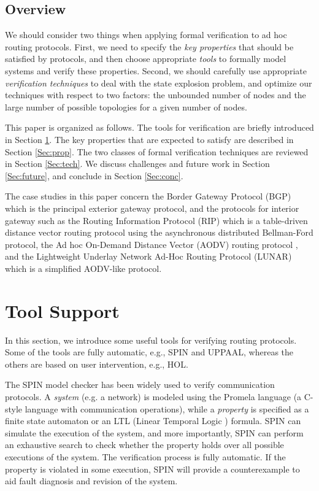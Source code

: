\documentclass[a4paper,10pt,twocolumn]{article}
\begin{document}
\subsection{Overview}
We should consider two things when applying formal verification to ad hoc routing protocols. First, we need to specify the \emph{key properties} that should be satisfied by protocols, and then choose appropriate \emph{tools} to formally model systems and verify these properties. Second, we should carefully use appropriate \emph{verification techniques} to deal with the state explosion problem, and optimize our techniques with respect to two factors: the unbounded number of nodes and the large number of possible topologies for a given number of nodes.

This paper is organized as follows. The tools for verification are briefly introduced in Section \ref{Sec:tool}. The key properties that are expected to satisfy are described in Section \ref{Sec:prop}. The two classes of formal verification techniques are reviewed in Section \ref{Sec:tech}. We discuss challenges and future work in Section \ref{Sec:future}, and conclude in Section \ref{Sec:conc}.

The case studies in this paper concern the Border Gateway Protocol (BGP) \cite{RL95,RL06} which is the principal exterior gateway protocol, and the protocols for interior gateway such as the Routing Information Protocol (RIP) \cite{Hed88,Mal93,Mal94} which is a table-driven distance vector routing protocol using the asynchronous distributed Bellman-Ford protocol, the Ad hoc On-Demand Distance Vector (AODV) routing protocol \cite{PB99,PBD03}, and the Lightweight Underlay Network Ad-Hoc Routing Protocol (LUNAR) \cite{TGRW04} which is a simplified AODV-like protocol.

\section{Tool Support}
\label{Sec:tool}
In this section, we introduce some useful tools for verifying routing protocols. Some of the tools are fully automatic, e.g., SPIN and UPPAAL, whereas the others are based on user intervention, e.g., HOL.

The SPIN model checker \cite{Hol97,Hol03} has been widely used to verify communication protocols. A \emph{system} (e.g. a network) is modeled using the Promela language (a C-style language with communication operations), while a \emph{property} is specified as a finite state automaton or an LTL (Linear Temporal Logic \cite{HR04}) formula. SPIN can simulate the execution of the system, and more importantly, SPIN can perform an exhaustive search to check whether the property holds over all possible executions of the system. The verification process is fully automatic. If the property is violated in some execution, SPIN will provide a counterexample to aid fault diagnosis and revision of the system.
\end{document}
